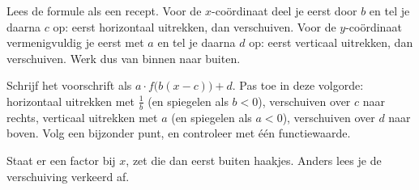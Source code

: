 Lees de formule als een recept. Voor de $x$-coördinaat deel je eerst door $b$ en tel je daarna $c$ op: eerst horizontaal uitrekken, dan verschuiven. Voor de $y$-coördinaat vermenigvuldig je eerst met $a$ en tel je daarna $d$ op: eerst verticaal uitrekken, dan verschuiven. Werk dus van binnen naar buiten.


\begin{werkwijze}
Schrijf het voorschrift als $a \cdot f\bigl(b(x - c)\bigr) + d$. Pas toe in deze volgorde: horizontaal uitrekken met $\frac1b$ (en spiegelen als $b < 0$), verschuiven over $c$ naar rechts, verticaal uitrekken met $a$ (en spiegelen als $a < 0$), verschuiven over $d$ naar boven. Volg een bijzonder punt, en controleer met één functiewaarde.
\end{werkwijze}

\begin{oefeningen}
\end{oefeningen}

Staat er een factor bij $x$, zet die dan eerst buiten haakjes. Anders lees je de verschuiving verkeerd af.

